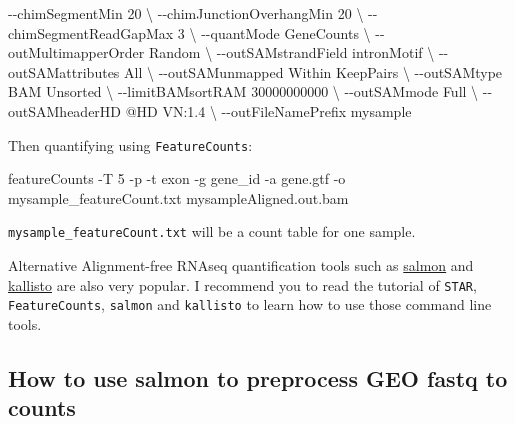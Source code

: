 \documentclass[
]{book}
\newenvironment{Shaded}{\begin{snugshade}}{\end{snugshade}}
\newcommand{\AttributeTok}[1]{\textcolor[rgb]{0.13,0.29,0.53}{#1}}
\newcommand{\DataTypeTok}[1]{\textcolor[rgb]{0.13,0.29,0.53}{#1}}
\newcommand{\ExtensionTok}[1]{#1}
\newcommand{\NormalTok}[1]{#1}
\begin{document}
\begin{Shaded}
\begin{Highlighting}[]
        \AttributeTok{{-}{-}chimSegmentMin}\NormalTok{ 20 }\DataTypeTok{\textbackslash{}}
        \AttributeTok{{-}{-}chimJunctionOverhangMin}\NormalTok{ 20 }\DataTypeTok{\textbackslash{}}
        \AttributeTok{{-}{-}chimSegmentReadGapMax}\NormalTok{ 3 }\DataTypeTok{\textbackslash{}}
        \AttributeTok{{-}{-}quantMode}\NormalTok{ GeneCounts }\DataTypeTok{\textbackslash{}}
        \AttributeTok{{-}{-}outMultimapperOrder}\NormalTok{ Random }\DataTypeTok{\textbackslash{}}
        \AttributeTok{{-}{-}outSAMstrandField}\NormalTok{ intronMotif }\DataTypeTok{\textbackslash{}}
        \AttributeTok{{-}{-}outSAMattributes}\NormalTok{ All }\DataTypeTok{\textbackslash{}}
        \AttributeTok{{-}{-}outSAMunmapped}\NormalTok{ Within KeepPairs }\DataTypeTok{\textbackslash{}}
        \AttributeTok{{-}{-}outSAMtype}\NormalTok{ BAM Unsorted }\DataTypeTok{\textbackslash{}}
        \AttributeTok{{-}{-}limitBAMsortRAM}\NormalTok{ 30000000000 }\DataTypeTok{\textbackslash{}}
        \AttributeTok{{-}{-}outSAMmode}\NormalTok{ Full }\DataTypeTok{\textbackslash{}}
        \AttributeTok{{-}{-}outSAMheaderHD}\NormalTok{ @HD VN:1.4 }\DataTypeTok{\textbackslash{}}
        \AttributeTok{{-}{-}outFileNamePrefix}\NormalTok{ mysample}
\end{Highlighting}
\end{Shaded}

Then quantifying using \texttt{FeatureCounts}:

\begin{Shaded}
\begin{Highlighting}[]
\ExtensionTok{featureCounts} \AttributeTok{{-}T}\NormalTok{ 5 }\AttributeTok{{-}p} \AttributeTok{{-}t}\NormalTok{ exon }\AttributeTok{{-}g}\NormalTok{ gene\_id }\AttributeTok{{-}a}\NormalTok{ gene.gtf }\AttributeTok{{-}o}\NormalTok{ mysample\_featureCount.txt mysampleAligned.out.bam}
\end{Highlighting}
\end{Shaded}

\texttt{mysample\_featureCount.txt} will be a count table for one sample.

Alternative Alignment-free RNAseq quantification tools such as \href{https://combine-lab.github.io/salmon/getting_started/}{salmon} and \href{https://pachterlab.github.io/kallisto/}{kallisto} are also very popular. I recommend you to read the tutorial of \texttt{STAR}, \texttt{FeatureCounts}, \texttt{salmon} and \texttt{kallisto} to learn how to use those command line tools.

\hypertarget{how-to-use-salmon-to-preprocess-geo-fastq-to-counts}{%
\subsection{How to use salmon to preprocess GEO fastq to counts}\label{how-to-use-salmon-to-preprocess-geo-fastq-to-counts}}
\end{document}
